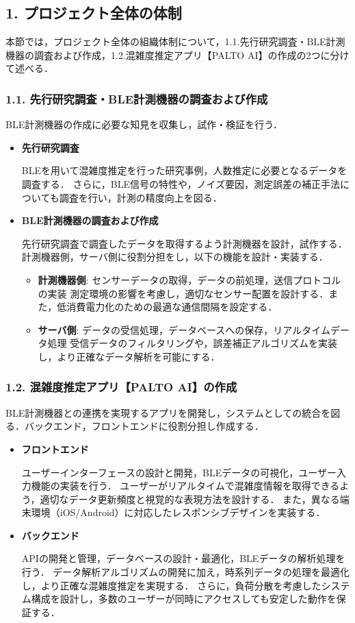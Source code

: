 \subsection*{1. プロジェクト全体の体制}
本節では，プロジェクト全体の組織体制について，1.1.先行研究調査・BLE計測機器の調査および作成，1.2.混雑度推定アプリ【PALTO AI】の作成の2つに分けて述べる．

\subsubsection*{1.1. 先行研究調査・BLE計測機器の調査および作成}
BLE計測機器の作成に必要な知見を収集し，試作・検証を行う．
\begin{itemize}
    \item {\bfseries 先行研究調査}
    
    BLEを用いて混雑度推定を行った研究事例，人数推定に必要となるデータを調査する．
	さらに，BLE信号の特性や，ノイズ要因，測定誤差の補正手法についても調査を行い，計測の精度向上を図る．
    
    \item {\bfseries BLE計測機器の調査および作成}
    
    先行研究調査で調査したデータを取得するよう計測機器を設計，試作する．
    計測機器側，サーバ側に役割分担をし，以下の機能を設計・実装する．
    \begin{itemize}
        \item {\bfseries 計測機器側}: センサーデータの取得，データの前処理，送信プロトコルの実装
		測定環境の影響を考慮し，適切なセンサー配置を設計する．また，低消費電力化のための最適な通信間隔を設定する．
        \item {\bfseries サーバ側}: データの受信処理，データベースへの保存，リアルタイムデータ処理
		受信データのフィルタリングや，誤差補正アルゴリズムを実装し，より正確なデータ解析を可能にする．
    \end{itemize}
\end{itemize}

\subsubsection*{1.2. 混雑度推定アプリ【PALTO AI】の作成}
BLE計測機器との連携を実現するアプリを開発し，システムとしての統合を図る．バックエンド，フロントエンドに役割分担し作成する．
\begin{itemize}
    \item {\bfseries フロントエンド}
    
    ユーザーインターフェースの設計と開発，BLEデータの可視化，ユーザー入力機能の実装を行う．
	ユーザーがリアルタイムで混雑度情報を取得できるよう，適切なデータ更新頻度と視覚的な表現方法を設計する．
	また，異なる端末環境（iOS/Android）に対応したレスポンシブデザインを実装する．
    
    \item {\bfseries バックエンド}
    
    APIの開発と管理，データベースの設計・最適化，BLEデータの解析処理を行う．
	データ解析アルゴリズムの開発に加え，時系列データの処理を最適化し，より正確な混雑度推定を実現する．
	さらに，負荷分散を考慮したシステム構成を設計し，多数のユーザーが同時にアクセスしても安定した動作を保証する．
\end{itemize}

